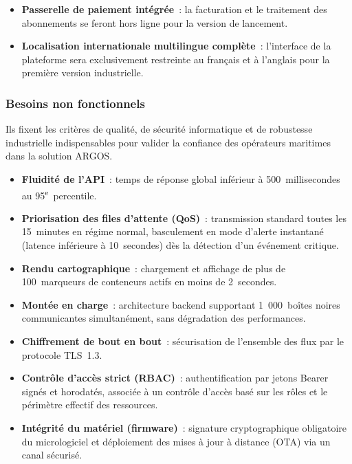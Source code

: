 \begin{itemize}
\item \textbf{Passerelle de paiement intégrée}~: la facturation et le traitement des abonnements se feront hors ligne pour la version de lancement.
\item \textbf{Localisation internationale multilingue complète}~: l'interface de la plateforme sera exclusivement restreinte au français et à l'anglais pour la première version industrielle.
\end{itemize}

\subsubsection{Besoins non fonctionnels}

Ils fixent les critères de qualité, de sécurité informatique et de robustesse industrielle indispensables pour valider la confiance des opérateurs maritimes dans la solution ARGOS.

\begin{itemize}
\item \textbf{Fluidité de l'API}~: temps de réponse global inférieur à 500~millisecondes au 95\textsuperscript{e}~percentile.
\item \textbf{Priorisation des files d'attente (QoS)}~: transmission standard toutes les 15~minutes en régime normal, basculement en mode d'alerte instantané (latence inférieure à 10~secondes) dès la détection d'un événement critique.
\item \textbf{Rendu cartographique}~: chargement et affichage de plus de 100~marqueurs de conteneurs actifs en moins de 2~secondes.
\item \textbf{Montée en charge}~: architecture backend supportant 1~000~boîtes noires communicantes simultanément, sans dégradation des performances.
\end{itemize}

\begin{itemize}
\item \textbf{Chiffrement de bout en bout}~: sécurisation de l'ensemble des flux par le protocole TLS~1.3.
\item \textbf{Contrôle d'accès strict (RBAC)}~: authentification par jetons Bearer signés et horodatés, associée à un contrôle d'accès basé sur les rôles et le périmètre effectif des ressources.
\item \textbf{Intégrité du matériel (firmware)}~: signature cryptographique obligatoire du micrologiciel et déploiement des mises à jour à distance (OTA) via un canal sécurisé.
\end{itemize}

